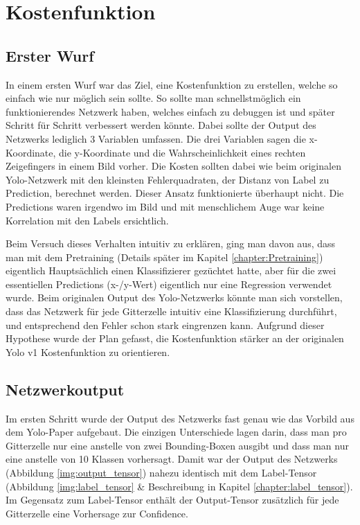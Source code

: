 \newpage
\section{Kostenfunktion}
\label{chapter:kostenfunktion} 
\subsection{Erster Wurf}
\label{chapter:erster_wurf}
In einem ersten Wurf war das Ziel, eine Kostenfunktion zu erstellen, welche so einfach wie nur möglich sein sollte. 
So sollte man schnellstmöglich ein funktionierendes Netzwerk haben, welches einfach zu debuggen ist und später Schritt für Schritt verbessert werden könnte.
Dabei sollte der Output des Netzwerks lediglich 3 Variablen umfassen. 
Die drei Variablen sagen die x-Koordinate, die y-Koordinate und die Wahrscheinlichkeit eines rechten Zeigefingers in einem Bild vorher.
Die Kosten sollten dabei wie beim originalen Yolo-Netzwerk mit den kleinsten Fehlerquadraten, der Distanz von Label zu Prediction, berechnet werden.
Dieser Ansatz funktionierte überhaupt nicht.
Die Predictions waren irgendwo im Bild und mit menschlichem Auge war keine Korrelation mit den Labels ersichtlich. 

Beim Versuch dieses Verhalten intuitiv zu erklären, ging man davon aus, dass man mit dem Pretraining (Details später im Kapitel \ref{chapter:Pretraining}) eigentlich Hauptsächlich einen Klassifizierer \grqq{}gezüchtet\grqq{} hatte, aber für die zwei essentiellen Predictions (x-/y-Wert) eigentlich nur eine Regression verwendet wurde.
Beim originalen Output des Yolo-Netzwerks könnte man sich vorstellen, dass das Netzwerk für jede Gitterzelle intuitiv eine Klassifizierung durchführt, und entsprechend den Fehler schon stark eingrenzen kann.
Aufgrund dieser Hypothese wurde der Plan gefasst, die Kostenfunktion stärker an der originalen Yolo v1 Kostenfunktion zu orientieren.

\subsection{Netzwerkoutput}
\label{chapter:netzwerkoutput}
Im ersten Schritt wurde der Output des Netzwerks fast genau wie das Vorbild aus dem Yolo-Paper \cite{yolo} aufgebaut. 
Die einzigen Unterschiede lagen darin, dass man pro Gitterzelle nur eine anstelle von zwei Bounding-Boxen ausgibt und dass man nur eine anstelle von 10 Klassen vorhersagt. 
Damit war der Output des Netzwerks (Abbildung \ref{img:output_tensor}) nahezu identisch mit dem Label-Tensor (Abbildung \ref{img:label_tensor} \& Beschreibung in Kapitel \ref{chapter:label_tensor}).
Im Gegensatz zum Label-Tensor enthält der Output-Tensor zusätzlich für jede Gitterzelle eine Vorhersage zur Confidence.

